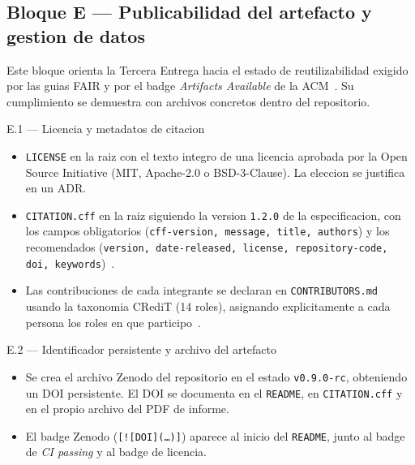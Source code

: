 \documentclass[11pt,a4paper]{article}
\begin{document}
\subsection{Bloque E --- Publicabilidad del artefacto y gestion de datos}

Este bloque orienta la Tercera Entrega hacia el estado de reutilizabilidad exigido por las guias FAIR y por el badge \emph{Artifacts Available} de la ACM~\cite{wilkinson2016fair,acm2020artifact}. Su cumplimiento se demuestra con archivos concretos dentro del repositorio.

\begin{cajaentregable}{E.1 --- Licencia y metadatos de citacion}
    \begin{itemize}
        \item \texttt{LICENSE} en la raiz con el texto integro de una licencia aprobada por la Open Source Initiative (MIT, Apache-2.0 o BSD-3-Clause). La eleccion se justifica en un ADR.
        \item \texttt{CITATION.cff} en la raiz siguiendo la version \texttt{1.2.0} de la especificacion, con los campos obligatorios (\texttt{cff-version, message, title, authors}) y los recomendados (\texttt{version, date-released, license, repository-code, doi, keywords})~\cite{druskat2021cff,smith2016software}.
        \item Las contribuciones de cada integrante se declaran en \texttt{CONTRIBUTORS.md} usando la taxonomia CRediT (14 roles), asignando explicitamente a cada persona los roles en que participo~\cite{niso2022credit}.
    \end{itemize}
\end{cajaentregable}

\begin{cajaentregable}{E.2 --- Identificador persistente y archivo del artefacto}
    \begin{itemize}
        \item Se crea el archivo Zenodo del repositorio en el estado \texttt{v0.9.0-rc}, obteniendo un DOI persistente. El DOI se documenta en el \texttt{README}, en \texttt{CITATION.cff} y en el propio archivo del PDF de informe.
        \item El badge Zenodo (\texttt{[![DOI](\ldots)]}) aparece al inicio del \texttt{README}, junto al badge de \emph{CI passing} y al badge de licencia.
    \end{itemize}
\end{cajaentregable}
\end{document}

